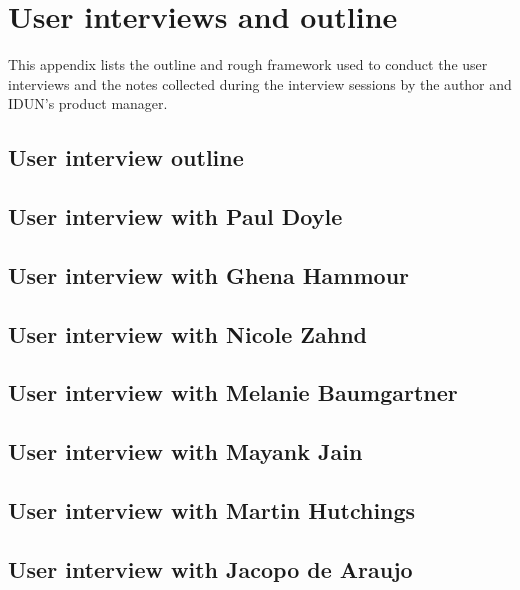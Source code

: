 \chapter{User interviews and outline}
\label{appendix3-user-interviews-and-outline}

This appendix lists the outline and rough framework used to conduct the user interviews and the notes collected during the interview sessions by the author and IDUN's product manager.

\section*{User interview outline}

\section*{User interview with Paul Doyle}

\section*{User interview with Ghena Hammour}

\section*{User interview with Nicole Zahnd}

\section*{User interview with Melanie Baumgartner}

\section*{User interview with Mayank Jain}

\section*{User interview with Martin Hutchings}

\section*{User interview with Jacopo de Araujo}

